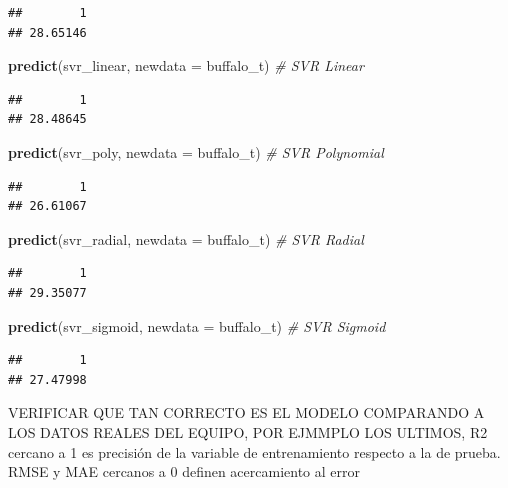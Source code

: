 \documentclass[
]{article}
\newenvironment{Shaded}{\begin{snugshade}}{\end{snugshade}}
\newcommand{\AttributeTok}[1]{\textcolor[rgb]{0.13,0.29,0.53}{#1}}
\newcommand{\CommentTok}[1]{\textcolor[rgb]{0.56,0.35,0.01}{\textit{#1}}}
\newcommand{\FunctionTok}[1]{\textcolor[rgb]{0.13,0.29,0.53}{\textbf{#1}}}
\newcommand{\NormalTok}[1]{#1}
\begin{document}
\begin{verbatim}
##        1 
## 28.65146
\end{verbatim}

\begin{Shaded}
\begin{Highlighting}[]
\FunctionTok{predict}\NormalTok{(svr\_linear, }\AttributeTok{newdata =}\NormalTok{ buffalo\_t)           }\CommentTok{\# SVR Linear}
\end{Highlighting}
\end{Shaded}

\begin{verbatim}
##        1 
## 28.48645
\end{verbatim}

\begin{Shaded}
\begin{Highlighting}[]
\FunctionTok{predict}\NormalTok{(svr\_poly, }\AttributeTok{newdata =}\NormalTok{ buffalo\_t)             }\CommentTok{\# SVR Polynomial}
\end{Highlighting}
\end{Shaded}

\begin{verbatim}
##        1 
## 26.61067
\end{verbatim}

\begin{Shaded}
\begin{Highlighting}[]
\FunctionTok{predict}\NormalTok{(svr\_radial, }\AttributeTok{newdata =}\NormalTok{ buffalo\_t)           }\CommentTok{\# SVR Radial}
\end{Highlighting}
\end{Shaded}

\begin{verbatim}
##        1 
## 29.35077
\end{verbatim}

\begin{Shaded}
\begin{Highlighting}[]
\FunctionTok{predict}\NormalTok{(svr\_sigmoid, }\AttributeTok{newdata =}\NormalTok{ buffalo\_t)          }\CommentTok{\# SVR Sigmoid}
\end{Highlighting}
\end{Shaded}

\begin{verbatim}
##        1 
## 27.47998
\end{verbatim}

VERIFICAR QUE TAN CORRECTO ES EL MODELO COMPARANDO A LOS DATOS REALES
DEL EQUIPO, POR EJMMPLO LOS ULTIMOS, R2 cercano a 1 es precisión de la
variable de entrenamiento respecto a la de prueba. RMSE y MAE cercanos a
0 definen acercamiento al error
\end{document}
